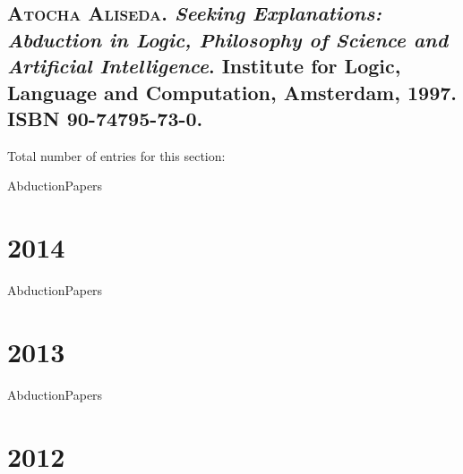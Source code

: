 \subsection*{\textsc{Atocha Aliseda}.
\newblock \emph{Seeking Explanations: Abduction in Logic, Philosophy of Science
  and Artificial Intelligence}.
\newblock Institute for Logic, Language and Computation, Amsterdam, 1997.
\newblock ISBN 90-74795-73-0.
}

Total number of entries for this section: 

\restartNumb

\begin{btUnit}
 \begin{btSect}{AbductionPapers}
  \section*{2014}
  \nocite{Magnani:UnderstandingAbduction}
  \btPrintCited
 \end{btSect}
\end{btUnit}

\keepNumb

\begin{btUnit}
 \begin{btSect}{AbductionPapers}
  \section*{2013}
  \nocite{Mackonis:InferenceBestExplanation}
  \nocite{Magnani:AbductionIgnorancePreserving}
  \btPrintCited
 \end{btSect}
\end{btUnit}


\begin{btUnit}
 \begin{btSect}{AbductionPapers}
  \section*{2012}
    \nocite{Finger:AutomatedFOAbduction}
    \nocite{FranconiNgoSherkhonov:DefinabilityAbductionProblem}
    \nocite{Rast:NonindexicalContext}
  \btPrintCited
 \end{btSect}
\end{btUnit}

